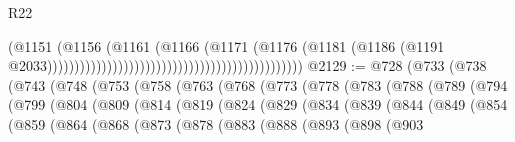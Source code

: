 \begin{lexlean}{R22}
\begin{coremodule}
                                                                                (@1151
                                                                                  (@1156
                                                                                    (@1161
                                                                                      (@1166
                                                                                        (@1171
                                                                                          (@1176
                                                                                            (@1181
                                                                                              (@1186
                                                                                                (@1191
                                                                                                  @2033)))))))))))))))))))))))))))))))))))))))))))))))
@2129 := @728
    (@733
      (@738
        (@743
          (@748
            (@753
              (@758
                (@763
                  (@768
                    (@773
                      (@778
                        (@783
                          (@788
                            (@789
                              (@794
                                (@799
                                  (@804
                                    (@809
                                      (@814
                                        (@819
                                          (@824
                                            (@829
                                              (@834
                                                (@839
                                                  (@844
                                                    (@849
                                                      (@854
                                                        (@859
                                                          (@864
                                                            (@868
                                                              (@873
                                                                (@878
                                                                  (@883
                                                                    (@888
                                                                      (@893
                                                                        (@898
                                                                          (@903

\end{coremodule}
\end{lexlean}
